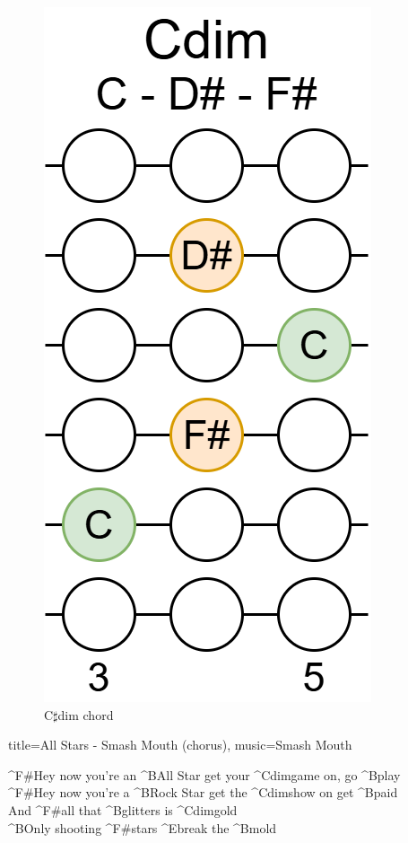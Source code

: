 \begin{figure}[h]
	\centering
	\includegraphics[height=0.16\textheight]{../../Images/CDimChord.png}
	\caption{C$\sharp$dim chord}
	\label{fig:guitar_c_sharp_dim_chord}
\end{figure}

\begin{song}[verse/numbered, align-chords=l]{title={All Stars - Smash Mouth (chorus)}, music={Smash Mouth}}
	\begin{chorus}
		^{F#}Hey now you're an ^{B}All Star get your ^{Cdim}game on, go ^{B}play \\
		^{F#}Hey now you're a ^{B}Rock Star get the ^{Cdim}show on get ^{B}paid \\
		And ^{F#}all that ^{B}glitters is ^{Cdim}gold \\
	 	^{B}Only shooting ^{F#}stars ^{E}break the ^{B}mold \\
	\end{chorus}
\end{song}


